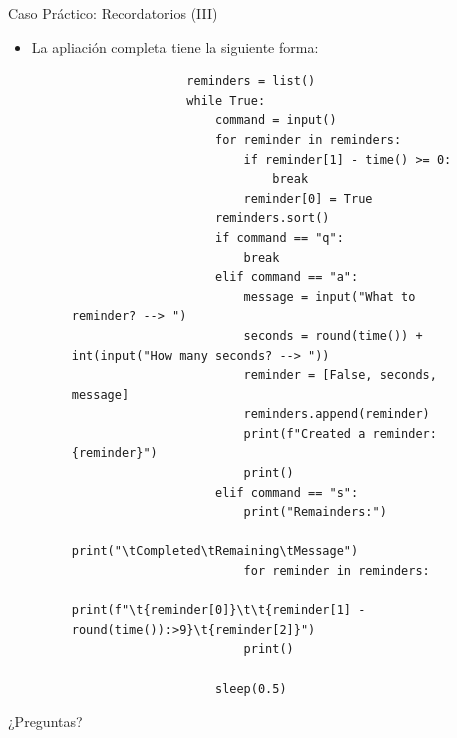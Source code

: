 \documentclass{beamer}
\begin{document}
    \begin{frame}[fragile]{Caso Práctico: Recordatorios (III)}
      \begin{itemize}
        \item La apliación completa tiene la siguiente forma:
        \begin{figure}
            \begin{minipage}[c]{\textwidth}
                \begin{verbatim}
                reminders = list()
                while True:
                    command = input()
                    for reminder in reminders:
                        if reminder[1] - time() >= 0:
                            break
                        reminder[0] = True
                    reminders.sort()
                    if command == "q":
                        break
                    elif command == "a":
                        message = input("What to reminder? --> ")
                        seconds = round(time()) + int(input("How many seconds? --> "))
                        reminder = [False, seconds, message]
                        reminders.append(reminder)
                        print(f"Created a reminder: {reminder}")
                        print()
                    elif command == "s":
                        print("Remainders:")
                        print("\tCompleted\tRemaining\tMessage")
                        for reminder in reminders:
                            print(f"\t{reminder[0]}\t\t{reminder[1] - round(time()):>9}\t{reminder[2]}")
                        print()

                    sleep(0.5)
                \end{verbatim}
            \end{minipage}
        \end{figure}
      \end{itemize}
    \end{frame}

    \begin{frame}
        \begin{center}
            \Huge
            ¿Preguntas?
        \end{center}
    \end{frame}
\end{document}
